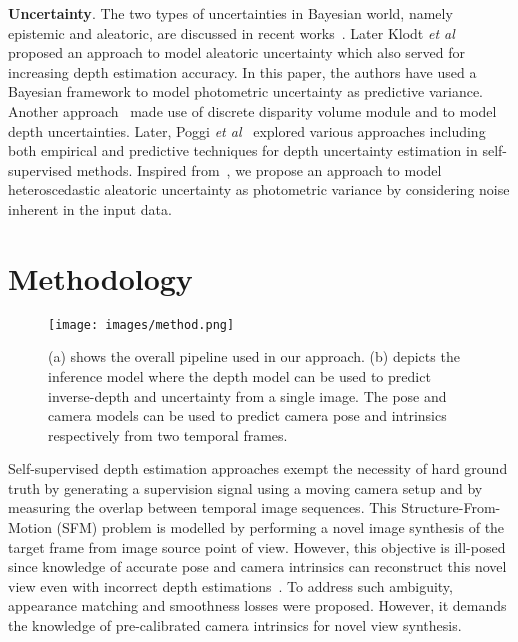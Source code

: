 \documentclass{bmvc2k}
\def\etal{\emph{et al}\bmvaOneDot}
\begin{document}
\textbf{Uncertainty}. The two types of uncertainties in Bayesian world, namely epistemic and aleatoric, are discussed in recent works~\cite{kendall2017uncertainties, kendall2018multi}. Later Klodt \etal~\cite{klodt2018supervising} proposed an approach to model aleatoric uncertainty which also served for increasing depth estimation accuracy. In this paper, the authors have used a Bayesian framework to model photometric uncertainty as predictive variance. Another approach~\cite{johnston2020self} made use of discrete disparity volume module and to model depth uncertainties. Later, Poggi \etal~\cite{poggi2020uncertainty} explored various approaches including both empirical and predictive techniques for depth uncertainty estimation in self-supervised methods. Inspired from~\cite{kendall2018multi}, we propose an approach to model heteroscedastic aleatoric uncertainty as photometric variance by considering noise inherent in the input data.




\vspace{-3mm}
\section{Methodology}
\label{sec:method}

\begin{figure*}
\begin{center}
\texttt{[image: images/method.png]}
\end{center}
\vspace{-10pt}
  \caption{(a) shows the overall pipeline used in our approach. (b) depicts the inference model where the depth model can be used to predict inverse-depth and uncertainty from a single image. The pose and camera models can be used to predict camera pose and intrinsics respectively from two temporal frames.}
\label{fig method}
\vspace{-5mm}
\end{figure*}


Self-supervised depth estimation approaches exempt the necessity of hard ground truth by generating a supervision signal using a moving camera setup and by measuring the overlap between temporal image sequences. This Structure-From-Motion (SFM) problem is modelled by performing a novel image synthesis of the target frame from image source point of view. However, this objective is ill-posed since knowledge of accurate pose and camera intrinsics can reconstruct this novel view even with incorrect depth estimations~\cite{godard2019digging}. To address such ambiguity, appearance matching and smoothness losses were proposed. However, it demands the knowledge of pre-calibrated camera intrinsics for novel view synthesis.
\end{document}
